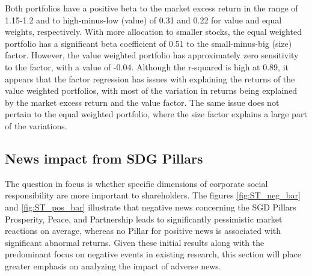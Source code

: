Both portfolios have a positive beta to the market excess return in the range of 1.15-1.2 and to high-minus-low (value) of 0.31 and 0.22 for value and equal weights, respectively. With more allocation to smaller stocks, the equal weighted portfolio has a significant beta coefficient of 0.51 to the small-minus-big (size) factor. However, the value weighted portfolio has approximately zero sensitivity to the factor, with a value of -0.04. Although the r-squared is high at 0.89, it appears that the factor regression has issues with explaining the returns of the value weighted portfolios, with most of the variation in returns being explained by the market excess return and the value factor. The same issue does not pertain to the equal weighted portfolio, where the size factor explains a large part of the variations. 






\subsection{News impact from SDG Pillars} \label{sec: short_term_analysis_SDG}

The question in focus is whether specific dimensions of corporate social responsibility are more important to shareholders. The figures \ref{fig:ST_neg_bar} and \ref{fig:ST_pos_bar} illustrate that negative news concerning the SGD Pillars Prosperity, Peace, and Partnership leads to significantly pessimistic market reactions on average, whereas no Pillar for positive news is associated with significant abnormal returns. Given these initial results along with the predominant focus on negative events in existing research, this section will place greater emphasis on analyzing the impact of adverse news. 

